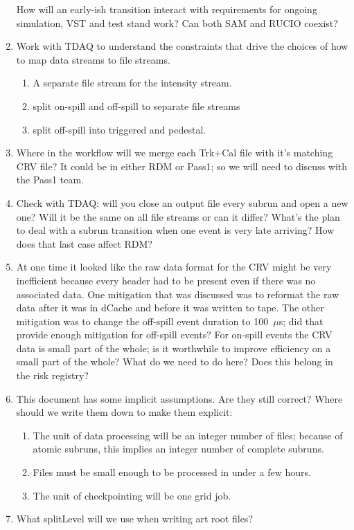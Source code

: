 \begin{enumerate}
    How will an early-ish transition interact with requirements for ongoing simulation, VST and test stand work?
    Can both SAM and RUCIO coexist?
  \item Work with TDAQ to understand the constraints that drive the choices of how to
    map data streams to file streams.
    \begin{enumerate}
      \item A separate file stream for the intensity stream.
      \item split on-spill and off-spill to separate file streams
      \item split off-spill into triggered and pedestal.
    \end{enumerate}
  \item Where in the workflow will we merge each Trk+Cal file with it's matching CRV file?
    It could be in either RDM or Pass1; so we will need to discuss with the Pass1 team.
  \item Check with TDAQ: will you close an output file every subrun and open a new one? Will it be the same
    on all file streams or can it differ?  What's the plan to deal with a subrun transition when one
    event is very late arriving?  How does that last case affect RDM?
  \item At one time it looked like the raw data format for the CRV might be very inefficient
    because every header had to be present even if there was no associated data.
    One mitigation that was discussed was to reformat the raw data after it was in dCache and before it was written to tape.
    The other mitigation was to change the off-spill event duration to 100~$\mu$s; did that provide enough mitigation for off-spill events?
    For on-spill events the CRV data is small part of the whole; is it worthwhile to improve efficiency on a small part of the whole?
    What do we need to do here?  Does this belong in the risk registry?
  \item This document has some implicit assumptions.  Are they still correct?  Where should we write them down to make them explicit:
    \begin{enumerate}
      \item The unit of data processing will be an integer number of files; because of atomic subruns, this implies an integer number
        of complete subruns.
      \item Files must be small enough to be processed in under a few hours.
      \item The unit of checkpointing will be one grid job.
    \end{enumerate}
 \item What splitLevel will we use when writing art root files?
\end{enumerate}

